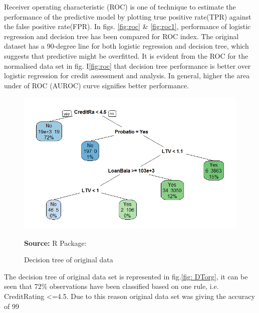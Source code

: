 Receiver operating characteristic (ROC) is one of technique to estimate the performance of the predictive model by plotting true positive rate(TPR) against the false positive rate(FPR). In figs. \ref{fig:roc} \& \ref{fig:roc1}, performance of logistic regression and decision tree has been compared for ROC index. The original dataset has a 90-degree line for both logistic regression and decision tree, which suggests that predictive might be overfitted. It is evident from the ROC for the normalised data set in fig. I\ref{fig:roc} that decision tree performance is better over logistic regression for credit assessment and analysis. In general, higher the area under of ROC (AUROC) curve signifies better performance. \\

\begin{center}
\begin{figure}[!htb]
\includegraphics[width=\textwidth]{DTorg.png}
\centering
\caption{Decision tree of original data}{\textbf{Source:} R Package:\citep{rpart.plotpackage}}
\label{fig:DTorg}
\end{figure}
\end{center}

The decision tree of original data set is represented in fig.\ref{fig: DTorg}, it can be seen that 72\% observations have been classified based on one rule, i.e. CreditRating <=4.5. Due to this reason original data set was giving the accuracy of 99%

